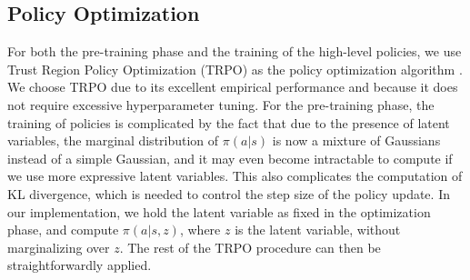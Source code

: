 \documentclass{article} %
\begin{document}
\subsection{Policy Optimization}
\label{section:method:polopt}

For both the pre-training phase and the training of the high-level policies, we use Trust Region Policy Optimization (TRPO) as the policy optimization algorithm \citep{Schulman15TRPO}. We choose TRPO due to its excellent empirical performance and because it does not require excessive hyperparameter tuning. For the pre-training phase, the training of policies is complicated by the fact that due to the presence of latent variables, the marginal distribution of $\pi(a|s)$ is now a mixture of Gaussians instead of a simple Gaussian, and it may even become intractable to compute if we use more expressive latent variables. This also complicates the computation of KL divergence, which is needed to control the step size of the policy update. In our implementation, we hold the latent variable as fixed in the optimization phase, and compute $\pi(a|s,z)$, where $z$ is the latent variable, without marginalizing over $z$. The rest of the TRPO procedure can then be straightforwardly applied. %








\end{document}
